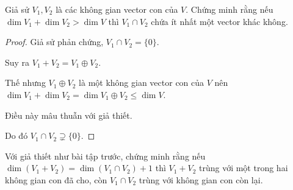 \documentclass[class=linear-algebra,crop=false]{standalone}
\begin{document}
\begin{exercise}Giả sử $V_{1}, V_{2}$ là các không gian vector con của $V$. Chứng minh rằng nếu $\dim V_{1} + \dim V_{2} > \dim V$ thì $V_{1}\cap V_{2}$ chứa ít nhất một vector khác không.
\end{exercise}

\begin{proof}Giả sử phản chứng, $V_{1}\cap V_{2} = \{ 0 \}$.
    \par Suy ra $V_{1} + V_{2} = V_{1}\oplus V_{2}$.
    \par Thế nhưng $V_{1}\oplus V_{2}$ là một không gian vector con của $V$ nên $\dim V_{1} + \dim V_{2} = \dim V_{1}\oplus V_{2} \le \dim V$.
    \par Điều này mâu thuẫn với giả thiết.
    \par Do đó $V_{1}\cap V_{2} \supsetneq \{ 0 \}$.
\end{proof}

\begin{exercise}Với giả thiết như bài tập trước, chứng minh rằng nếu $\dim(V_{1} + V_{2}) = \dim(V_{1}\cap V_{2}) + 1$ thì $V_{1} + V_{2}$ trùng với một trong hai không gian con đã cho, còn $V_{1}\cap V_{2}$ trùng với không gian con còn lại.
\end{exercise}
\end{document}
